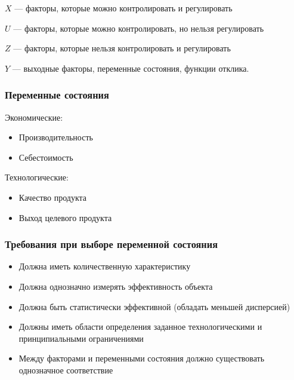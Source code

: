 \begin{frame}
	$X$ --- факторы, которые можно контролировать и регулировать
	

	$U$ --- факторы, которые можно контролировать, но нельзя регулировать
	
	$Z$ --- факторы, которые нельзя контролировать и регулировать
	
	$Y$ --- выходные факторы, переменные состояния, функции отклика.
\end{frame}

\begin{frame}
	\frametitle{Переменные состояния}
	Экономические:
	\begin{itemize}
		\item Производительность
		\item Себестоимость
	\end{itemize}
	Технологические:
	\begin{itemize}
		\item Качество продукта
		\item Выход целевого продукта
	\end{itemize}
	
\end{frame}

\begin{frame}
	\frametitle{Требования при выборе переменной состояния}

	\begin{itemize}
		\item Должна иметь количественную характеристику
		\item Должна однозначно измерять эффективность объекта
		\item Должна быть статистически эффективной (обладать меньшей дисперсией)
		\item Должны иметь области определения заданное технологическими и принципиальными ограничениями
		\item Между факторами и переменными состояния должно существовать однозначное соответствие
	\end{itemize}
	
\end{frame}

